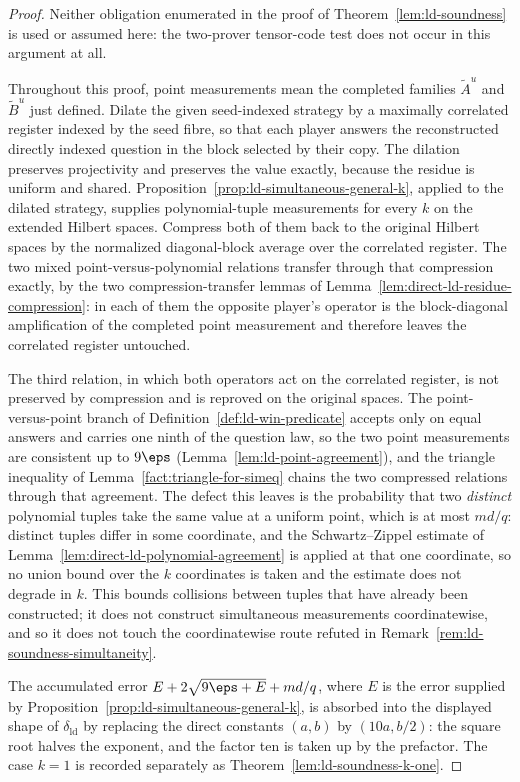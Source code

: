 \begin{proof}
	\leanok
	Neither obligation enumerated in the proof of Theorem~\ref{lem:ld-soundness} is used or assumed here: the two-prover tensor-code test does not occur in this argument at all.

	Throughout this proof, point measurements mean the completed families
	$\widetilde A^u$ and $\widetilde B^u$ just defined.
	Dilate the given seed-indexed strategy by a maximally correlated register indexed by the seed fibre, so that each player answers the reconstructed directly indexed question in the block selected by their copy. The dilation preserves projectivity and preserves the value exactly, because the residue is uniform and shared. Proposition~\ref{prop:ld-simultaneous-general-k}, applied to the dilated strategy, supplies polynomial-tuple measurements for every $k$ on the extended Hilbert spaces. Compress both of them back to the original Hilbert spaces by the normalized diagonal-block average over the correlated register. The two mixed point-versus-polynomial relations transfer through that compression exactly, by the two compression-transfer lemmas of Lemma~\ref{lem:direct-ld-residue-compression}: in each of them the opposite player's operator is the block-diagonal amplification of the completed point measurement and therefore leaves the correlated register untouched.

	The third relation, in which both operators act on the correlated register, is not preserved by compression and is reproved on the original spaces. The point-versus-point branch of Definition~\ref{def:ld-win-predicate} accepts only on equal answers and carries one ninth of the question law, so the two point measurements are consistent up to $9\eps$ (Lemma~\ref{lem:ld-point-agreement}), and the triangle inequality of Lemma~\ref{fact:triangle-for-simeq} chains the two compressed relations through that agreement. The defect this leaves is the probability that two \emph{distinct} polynomial tuples take the same value at a uniform point, which is at most $md/q$: distinct tuples differ in some coordinate, and the Schwartz--Zippel estimate of Lemma~\ref{lem:direct-ld-polynomial-agreement} is applied at that one coordinate, so no union bound over the $k$ coordinates is taken and the estimate does not degrade in $k$. This bounds collisions between tuples that have already been constructed; it does not construct simultaneous measurements coordinatewise, and so it does not touch the coordinatewise route refuted in Remark~\ref{rem:ld-soundness-simultaneity}.

	The accumulated error $E + 2\sqrt{9\eps + E} + md/q$, where $E$ is the error supplied by Proposition~\ref{prop:ld-simultaneous-general-k}, is absorbed into the displayed shape of $\delta_{\mathrm{ld}}$ by replacing the direct constants $(a,b)$ by $(10a, b/2)$: the square root halves the exponent, and the factor ten is taken up by the prefactor. The case $k = 1$ is recorded separately as Theorem~\ref{lem:ld-soundness-k-one}.
\end{proof}


